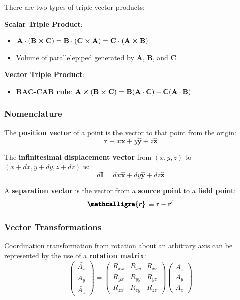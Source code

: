 \documentclass{article}
\newcommand{\boldscriptr}{\pmb{\mathcalligra{r}}\,}
\begin{document}
There are two types of triple vector products:

\textbf{Scalar Triple Product}:
\begin{itemize}
    \item \(\mathbf{A} \cdot (\mathbf{B}  \cross \mathbf{C} )=\mathbf{B} \cdot (\mathbf{C} \cross \mathbf{A} )=\mathbf{C} \cdot (\mathbf{A}  \cross \mathbf{B} )\)
    \item Volume of parallelepiped generated by \(\mathbf{A} \), \(\mathbf{B} \), and \(\mathbf{C} \)    
\end{itemize}

\textbf{Vector Triple Product}:
\begin{itemize}
    \item \textbf{BAC-CAB rule}: \(\mathbf{A} \cross (\mathbf{B} \cross \mathbf{C} )=\mathbf{B} (\mathbf{A} \cdot \mathbf{C} )-\mathbf{C} (\mathbf{A} \cdot \mathbf{B} )\) 
\end{itemize}

\subsubsection{Nomenclature}
\begin{definition}
    The \textbf{position vector} of a point is the vector to that point from the origin:
    \[
        \mathbf{r} \equiv x \mathbf{\hat{x}} +y \mathbf{\hat{y}} +z \mathbf{\hat{z}} 
    \]
\end{definition}

\begin{definition}
    The \textbf{infinitesimal displacement vector} from \((x,y,z)\) to \((x+dx, y+dy, z+dz)\) is:
    \[
        d \mathbf{I} =dx \mathbf{\hat{x}} + dy \mathbf{\hat{y}} +dz \mathbf{\hat{z}} 
    \]  
\end{definition}

\begin{definition}
    A \textbf{separation vector} is the vector from a \textbf{source point} to a \textbf{field point}:
    \[
        \boldscriptr \equiv \mathbf{r} - \mathbf{r^{\prime}}
    \]
\end{definition}

\subsubsection{Vector Transformations}

Coordination transformation from rotation about an arbitrary axis can be represented by the use of 
a \textbf{rotation matrix}:
\[
    \begin{pmatrix} \bar{A_x} \\ \bar{A_y} \\ \bar{A_z} \end{pmatrix} = \begin{pmatrix} R_{xx} & R_{xy} & R_{xz} \\ R_{yx} & R_{yy} & R_{yz} \\ R_{zx} & R_{zy} & R_{zz} \end{pmatrix} \begin{pmatrix} A_x \\ A_y \\ A_z \end{pmatrix}   
\]
\end{document}
